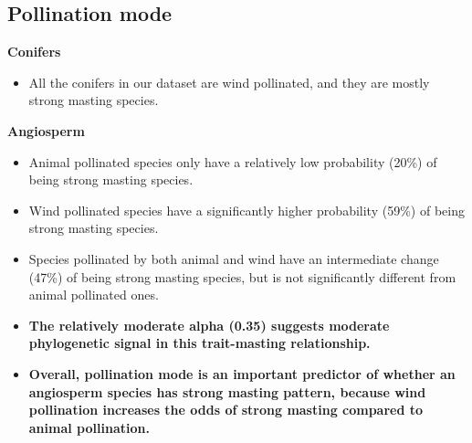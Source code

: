 \documentclass{article}
\begin{document}
\subsection{Pollination mode}
\textbf{Conifers}\\
\begin{itemize}
\item All the conifers in our dataset are wind pollinated, and they are mostly strong masting species.
\end{itemize}
\textbf{Angiosperm}\\
\begin{itemize}
\item Animal pollinated species only have a relatively low probability (20\%) of being strong masting species.
\item Wind pollinated species have a significantly higher probability (59\%) of being strong masting species.
\item Species pollinated by both animal and wind have an intermediate change (47\%) of being strong masting species, but is not significantly different from animal pollinated ones.
\item \textbf{The relatively moderate alpha (0.35) suggests moderate phylogenetic signal in this trait-masting relationship.}
\item \textbf{Overall, pollination mode is an important predictor of whether an angiosperm species has strong masting pattern, because wind pollination increases the odds of strong masting compared to animal pollination.}
\end{itemize}
\end{document}
